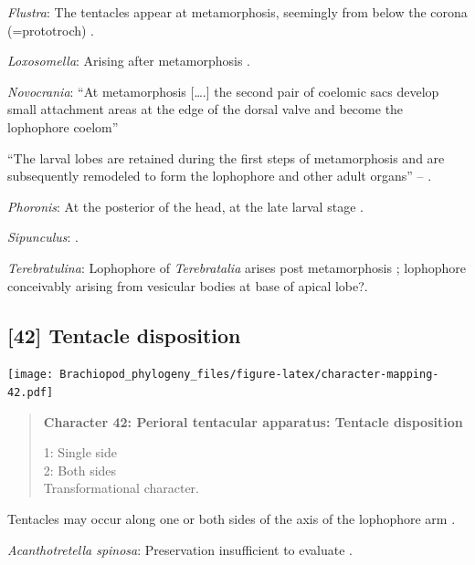 \documentclass[openany]{book}
\begin{document}
\hypertarget{Flustra-coding-41}{}
\emph{Flustra}: The tentacles appear at metamorphosis, seemingly from
below the corona (=prototroch) \citep{Young2002}.

\hypertarget{Loxosomella-coding-41}{}
\emph{Loxosomella}: Arising after metamorphosis \citep{Nielsen1971}.

\hypertarget{Novocrania-coding-41}{}
\emph{Novocrania}: ``At metamorphosis {[}\ldots{}.{]} the second pair of
coelomic sacs develop small attachment areas at the edge of the dorsal
valve and become the lophophore coelom'' \citep{Nielsen1991}

``The larval lobes are retained during the first steps of metamorphosis
and are\\
subsequently remodeled to form the lophophore and other adult organs''
-- \citet{Altenburger2013}.

\hypertarget{Phoronis-coding-41}{}
\emph{Phoronis}: At the posterior of the head, at the late larval stage
\citep{Santagata2004}.

\hypertarget{Sipunculus-coding-41}{}
\emph{Sipunculus}: \citep{Adrianov2006}.

\hypertarget{Terebratulina-coding-41}{}
\emph{Terebratulina}: Lophophore of \emph{Terebratalia} arises post
metamorphosis \citep{Young2002}; lophophore conceivably arising from
vesicular bodies at base of apical lobe?.

\subsection*{{[}42{]} Tentacle disposition}\label{tentacle-disposition}

\texttt{[image: Brachiopod\_phylogeny\_files/figure-latex/character-mapping-42.pdf]}

\begin{quote}
\textbf{Character 42: Perioral tentacular apparatus: Tentacle
disposition}

1: Single side\\
2: Both sides\\
Transformational character.
\end{quote}

Tentacles may occur along one or both sides of the axis of the
lophophore arm \citep{Carlson1995Phylogeneticrelationships}.

\hypertarget{Acanthotretella_spinosa-coding-42}{}
\emph{Acanthotretella spinosa}: Preservation insufficient to evaluate
\citep{Holmer2006Aspinose}.
\end{document}

